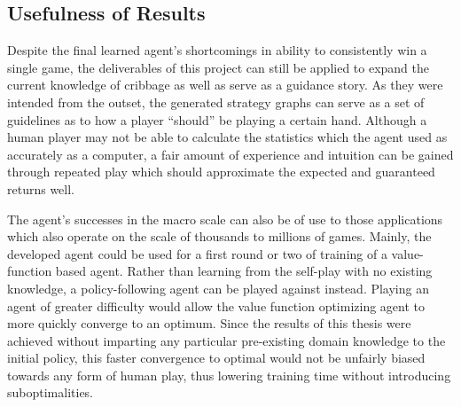 
\subsection{Usefulness of Results}


Despite the final learned agent's shortcomings in ability to consistently win
a single game,
the deliverables of this project can still be applied to expand the current
knowledge of cribbage as well as serve as a guidance story.
%
As they were intended from the outset,
the generated strategy graphs can serve as a set of guidelines as to how a
player ``should'' be playing a certain hand.
%
Although a human player may not be able to calculate the statistics which the
agent used as accurately as a computer,
a fair amount of experience and intuition can be gained through repeated
play which should approximate the expected and guaranteed returns well.

The agent's successes in the macro scale can also be of use to those
applications which also operate on the scale of thousands to millions of games.
%
Mainly,
the developed agent could be used for a first round or two of training
of a value-function based agent.
%
Rather than learning from the self-play with no existing knowledge,
a policy-following agent can be played against instead.
%
Playing an agent of greater difficulty would allow the value function optimizing
agent to more quickly converge to an optimum.
%
Since the results of this thesis were achieved without imparting any particular 
pre-existing domain knowledge to the initial policy,
this faster convergence to optimal would not be unfairly biased
towards any form of human play,
thus lowering training time without introducing suboptimalities.






